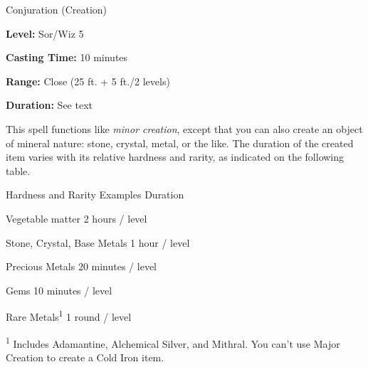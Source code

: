 
Conjuration (Creation)

\textbf{Level:} Sor/Wiz 5

\textbf{Casting Time:} 10 minutes

\textbf{Range:} Close (25 ft. + 5 ft./2 levels)

\textbf{Duration:} See text

This spell functions like \textit{minor creation}, except that you can also create 
an object of mineral nature: stone, crystal, metal, or the like. The duration of 
the created item varies with its relative hardness and rarity, as indicated on 
the following table.

\begin{description*}
\item[Hardness and Rarity Examples] Duration
\item[Vegetable matter] 2 hours / level
\item[Stone, Crystal, Base Metals] 1 hour / level
\item[Precious Metals] 20 minutes / level
\item[Gems] 10 minutes / level
\item[Rare Metals\textsuperscript{1}] 1 round / level
\end{description*}

\textsuperscript{1} Includes Adamantine, Alchemical Silver, and Mithral. You can't use Major Creation to create a Cold Iron item.
